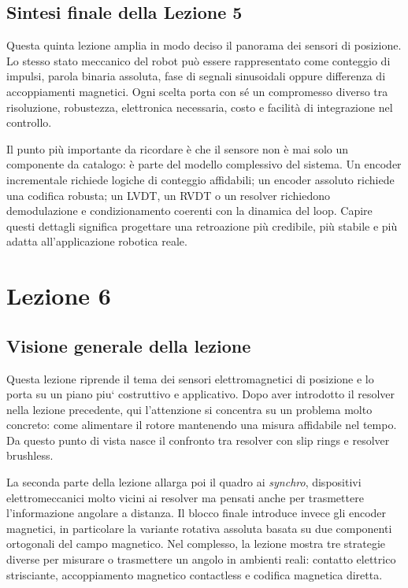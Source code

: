 \documentclass[11pt,a4paper]{article}
\begin{document}
\subsection*{Sintesi finale della Lezione 5}

Questa quinta lezione amplia in modo deciso il panorama dei sensori di posizione. Lo stesso stato meccanico del robot può essere rappresentato come conteggio di impulsi, parola binaria assoluta, fase di segnali sinusoidali oppure differenza di accoppiamenti magnetici. Ogni scelta porta con sé un compromesso diverso tra risoluzione, robustezza, elettronica necessaria, costo e facilità di integrazione nel controllo.

Il punto più importante da ricordare è che il sensore non è mai solo un componente da catalogo: è parte del modello complessivo del sistema. Un encoder incrementale richiede logiche di conteggio affidabili; un encoder assoluto richiede una codifica robusta; un LVDT, un RVDT o un resolver richiedono demodulazione e condizionamento coerenti con la dinamica del loop. Capire questi dettagli significa progettare una retroazione più credibile, più stabile e più adatta all’applicazione robotica reale.


\clearpage
\section{Lezione 6}

\subsection{Visione generale della lezione}

Questa lezione riprende il tema dei sensori elettromagnetici di posizione e lo porta su un piano piu` costruttivo e applicativo. Dopo aver introdotto il resolver nella lezione precedente, qui l’attenzione si concentra su un problema molto concreto: come alimentare il rotore mantenendo una misura affidabile nel tempo. Da questo punto di vista nasce il confronto tra resolver con slip rings e resolver brushless.

La seconda parte della lezione allarga poi il quadro ai \emph{synchro}, dispositivi elettromeccanici molto vicini ai resolver ma pensati anche per trasmettere l’informazione angolare a distanza. Il blocco finale introduce invece gli encoder magnetici, in particolare la variante rotativa assoluta basata su due componenti ortogonali del campo magnetico. Nel complesso, la lezione mostra tre strategie diverse per misurare o trasmettere un angolo in ambienti reali: contatto elettrico strisciante, accoppiamento magnetico contactless e codifica magnetica diretta.
\end{document}

